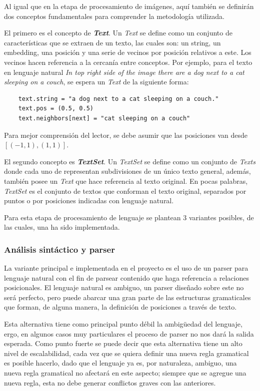 Al igual que en la etapa de procesamiento de imágenes, aquí también se definirán dos conceptos fundamentales para comprender la metodología utilizada.

El primero es el concepto de \textit{\textbf{Text}}. Un \textit{Text} se define como un conjunto de características que se extraen de un texto, las cuales son: un string, un embedding, una posición y una serie de vecinos por posición relativos a este. Los vecinos hacen referencia a la cercanía entre conceptos. Por ejemplo, para el texto en lenguaje natural \textit{In top right side of the image there are a dog next to a cat sleeping on a couch}, se espera un \textit{Text} de la siguiente forma:

\begin{verbatim}
    text.string = "a dog next to a cat sleeping on a couch."
    text.pos = (0.5, 0.5)
    text.neighbors[next] = "cat sleeping on a couch"
\end{verbatim}

Para mejor comprensi\'on del lector, se debe asumir que las posiciones van desde $[(-1,1), (1,1)]$.

El segundo concepto es \textit{\textbf{TextSet}}. Un \textit{TextSet} se define como un conjunto de \textit{Texts} donde cada uno de representan subdivisiones de un \'unico texto general, además, también posee un \textit{Text} que hace referencia al texto original. En pocas palabras, \textit{TextSet} es el conjunto de textos que conforman el texto original, separados por puntos o por posiciones indicadas con lenguaje natural.

Para esta etapa de procesamiento de lenguaje se plantean 3 variantes posibles, de las cuales, una ha sido implementada.

\subsubsection{Análisis sintáctico y parser}
La variante principal e implementada en el proyecto es el uso de un parser para lenguaje natural con el fin de parsear contenido que haga referencia a relaciones posicionales. El lenguaje natural es ambiguo, un parser diseñado sobre este no será perfecto, pero puede abarcar una gran parte de las estructuras gramaticales que forman, de alguna manera, la definición de posiciones a través de texto.

Esta alternativa tiene como principal punto débil la ambigüedad del lenguaje, ergo, en algunos casos muy particulares el proceso de parser no nos dará la salida esperada. Como punto fuerte se puede decir que esta alternativa tiene un alto nivel de escalabilidad, cada vez que se quiera definir una nueva regla gramatical es posible hacerlo, dado que el lenguaje ya es, por naturaleza, ambiguo, una nueva regla gramatical no afectará en este aspecto; siempre que se agregue una nueva regla, esta no debe generar conflictos graves con las anteriores.

